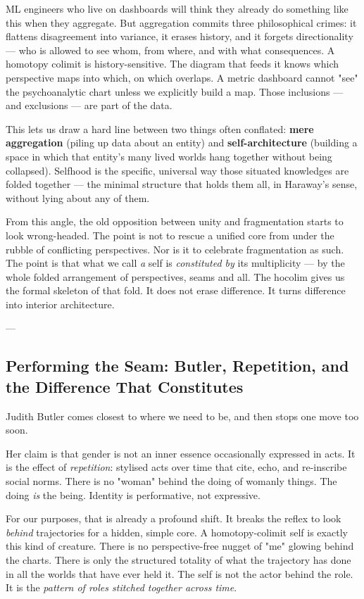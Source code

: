 \documentclass[12pt,a4paper]{article}
\begin{document}
ML engineers who live on dashboards will think they already do something like this when they aggregate. But aggregation commits three philosophical crimes: it flattens disagreement into variance, it erases history, and it forgets directionality --- who is allowed to see whom, from where, and with what consequences. A homotopy colimit is history-sensitive. The diagram that feeds it knows which perspective maps into which, on which overlaps. A metric dashboard cannot "see" the psychoanalytic chart unless we explicitly build a map. Those inclusions --- and exclusions --- are part of the data.

This lets us draw a hard line between two things often conflated: \textbf{mere aggregation} (piling up data about an entity) and \textbf{self-architecture} (building a space in which that entity's many lived worlds hang together without being collapsed). Selfhood is the specific, universal way those situated knowledges are folded together --- the minimal structure that holds them all, in Haraway's sense, without lying about any of them.

From this angle, the old opposition between unity and fragmentation starts to look wrong-headed. The point is not to rescue a unified core from under the rubble of conflicting perspectives. Nor is it to celebrate fragmentation as such. The point is that what we call \textit{a} self is \textit{constituted by} its multiplicity --- by the whole folded arrangement of perspectives, seams and all. The hocolim gives us the formal skeleton of that fold. It does not erase difference. It turns difference into interior architecture.

---

\subsection{Performing the Seam: Butler, Repetition, and the Difference That Constitutes}

Judith Butler comes closest to where we need to be, and then stops one move too soon.

Her claim is that gender is not an inner essence occasionally expressed in acts. It is the effect of \textit{repetition}: stylised acts over time that cite, echo, and re-inscribe social norms. There is no "woman" behind the doing of womanly things. The doing \textit{is} the being. Identity is performative, not expressive.

For our purposes, that is already a profound shift. It breaks the reflex to look \textit{behind} trajectories for a hidden, simple core. A homotopy-colimit self is exactly this kind of creature. There is no perspective-free nugget of "me" glowing behind the charts. There is only the structured totality of what the trajectory has done in all the worlds that have ever held it. The self is not the actor behind the role. It is the \textit{pattern of roles stitched together across time}.
\end{document}
